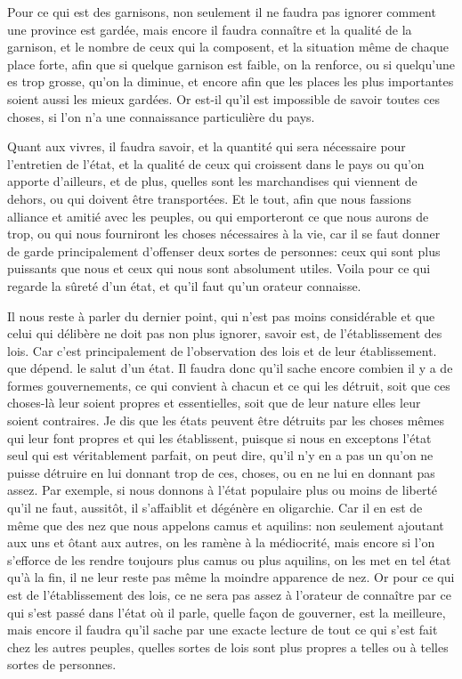Pour ce qui est des garnisons, non seulement il ne faudra pas ignorer comment une province est gardée, mais encore il faudra connaître
et la qualité de la garnison, et le nombre de ceux qui la composent, et la situation même de chaque place forte, afin que si quelque
garnison est faible, on la renforce, ou si quelqu'une es trop grosse, qu'on la diminue, et encore afin que les places les plus
importantes soient aussi les mieux gardées. Or est-il qu'il est impossible de savoir toutes ces choses, si l'on n'a une connaissance
particulière du pays.

Quant aux vivres, il faudra savoir, et la quantité qui sera nécessaire pour l'entretien de l'état, et la qualité de ceux qui croissent
dans le pays ou qu'on apporte d'ailleurs, et de plus, quelles sont les marchandises qui viennent de dehors, ou qui doivent être transportées.
Et le tout, afin que nous fassions alliance et amitié avec les peuples, ou qui emporteront ce que nous aurons de trop, ou qui nous fourniront
les choses nécessaires à la vie, car il se faut donner de garde principalement d'offenser deux sortes de personnes: ceux qui sont plus
puissants que nous et ceux qui nous sont absolument utiles. Voila pour ce qui regarde la sûreté d'un état, et qu'il faut qu'un orateur connaisse.

\bigbreak

Il nous reste à parler du dernier point, qui n'est pas moins considérable et que celui qui délibère ne doit pas non plus ignorer, savoir est,
de l'établissement des lois. Car c'est principalement de l'observation des lois et de leur établissement. que dépend. le salut d'un état. Il
faudra donc qu'il sache encore combien il y a de formes gouvernements, ce qui convient à chacun et ce qui les détruit, soit que ces choses-là
leur soient propres et essentielles, soit que de leur nature elles leur soient contraires. Je dis que les états peuvent être détruits par les
choses mêmes qui leur font propres et qui les établissent, puisque si nous en exceptons l'état seul qui est véritablement parfait, on peut dire,
qu'il n'y en a pas un qu'on ne puisse détruire en lui donnant trop de ces, choses, ou en ne lui en donnant pas assez. Par exemple, si nous
donnons à l'état populaire plus ou moins de liberté qu'il ne faut, aussitôt, il s'affaiblit et dégénère en oligarchie. Car il en est de même que
des nez que nous appelons camus et aquilins: non seulement ajoutant aux uns et ôtant aux autres, on les ramène à la médiocrité, mais encore si
l'on s'efforce de les rendre toujours plus camus ou plus aquilins, on les met en tel état qu'à la fin, il ne leur reste pas même la moindre
apparence de nez. Or pour ce qui est de l'établissement des lois, ce ne sera pas assez à l'orateur de connaître par ce qui s'est passé dans l'état
où il parle, quelle façon de gouverner, est la meilleure, mais encore il faudra qu'il sache par une exacte lecture de tout ce qui s'est fait chez
les autres peuples, quelles sortes de lois sont plus propres a telles ou à telles sortes de personnes.

